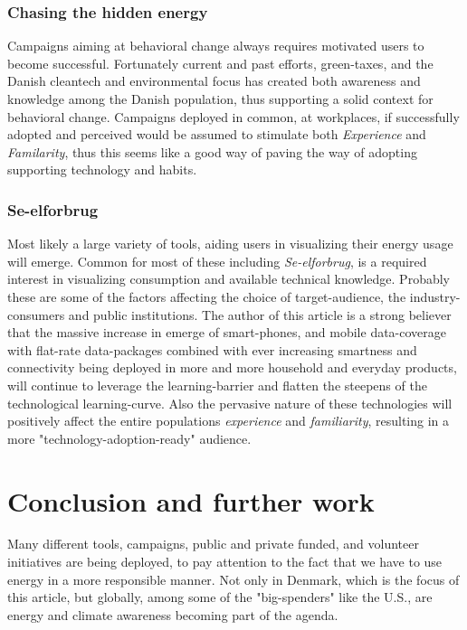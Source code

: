 \documentclass[journal]{IEEEtran}
\begin{document}
\subsubsection{Chasing the hidden energy}
Campaigns aiming at behavioral change always requires motivated users to become successful. Fortunately current and past efforts, green-taxes, and the Danish cleantech and environmental focus has created both awareness and knowledge among the Danish population, thus supporting a solid context for behavioral change. Campaigns deployed in common, at workplaces, if successfully adopted and perceived would be assumed to stimulate both \textit{Experience} and \textit{Familarity}, thus this seems like a good way of paving the way of adopting supporting technology and habits. 

\subsubsection{Se-elforbrug}
Most likely a large variety of tools, aiding users in visualizing their energy usage will emerge. Common for most of these including \textit{Se-elforbrug}, is a required interest in visualizing consumption and available technical knowledge. Probably these are some of the factors affecting the choice of target-audience, the industry-consumers and public institutions.
The author of this article is a strong believer that the massive increase in emerge of smart-phones, and mobile data-coverage with flat-rate data-packages combined with ever increasing smartness and connectivity being deployed in more and more household and everyday products, will continue to leverage the learning-barrier and flatten the steepens of the technological learning-curve. Also the pervasive nature of these technologies will positively affect the entire populations \textit{experience} and \textit{familiarity}, resulting in a more "technology-adoption-ready" audience.


\section{Conclusion and further work}
Many different tools, campaigns, public and private funded, and volunteer initiatives are being deployed, to pay attention to the fact that we have to use energy in a more responsible manner. Not only in Denmark, which is the focus of this article, but globally,  among some of the "big-spenders" like the U.S., are energy and climate awareness becoming part of the agenda. \newline
\end{document}
